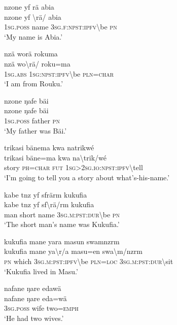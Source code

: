 \ea\label{ex:9:a2214}
nzone yf rä abia\\
\gll nzone	yf	{\textbackslash}rä/	abia\\
     1\textsc{sg}.\textsc{poss}	name	3\textsc{sg}.\textsc{f}:\textsc{npst}:\textsc{ipfv}{\textbackslash}be	\textsc{pn}\\
\glt `My name is Abia.'
\z

\ea\label{ex:9:a2216}
nzä worä rokuma\\
\gll nzä	wo{\textbackslash}rä/	roku=ma\\
     1\textsc{sg}.\textsc{abs}	1\textsc{sg}:\textsc{npst}:\textsc{ipfv}{\textbackslash}be	\textsc{pln}=\textsc{char}\\
\glt `I am from Rouku.'
\z

\ea\label{ex:9:a2218}
nzone ŋafe bäi\\
\gll nzone	ŋafe	bäi\\
     1\textsc{sg}.\textsc{poss}	father	\textsc{pn}\\
\glt `My father was Bäi.'
\z

\ea\label{ex:9:a2219}
trikasi bänema kwa natrikwé\\
\gll trikasi	bäne=ma	kwa	na{\textbackslash}trik/wé\\
     story	\textsc{ph}=\textsc{char}	\textsc{fut}	1\textsc{sg}>2\textsc{sg}.\textsc{io}:\textsc{npst}:\textsc{ipfv}{\textbackslash}tell\\
\glt `I'm going to tell you a story about what's-his-name.'
\z

\ea\label{ex:9:a2220}
kabe tnz yf sfrärm kukufia\\
\gll kabe	tnz	yf	sf{\textbackslash}rä/rm	kukufia\\
     man	short	name	3\textsc{sg}.\textsc{m}:\textsc{pst}:\textsc{dur}{\textbackslash}be	\textsc{pn}\\
\glt `The short man's name was Kukufia.'
\z

\ea\label{ex:9:a2221}
kukufia mane yara masun swamnzrm\\
\gll kukufia	mane	ya{\textbackslash}r/a	masu=en	swa{\textbackslash}m/nzrm\\
     \textsc{pn}	which	3\textsc{sg}.\textsc{m}:\textsc{pst}:\textsc{ipfv}{\textbackslash}be	\textsc{pln}=\textsc{loc}	3\textsc{sg}.\textsc{m}:\textsc{pst}:\textsc{dur}{\textbackslash}sit\\
\glt `Kukufia lived in Masu.'
\z

\ea\label{ex:9:a2223}
nafane ŋare edawä\\
\gll nafane	ŋare	eda=wä\\
     3\textsc{sg}.\textsc{poss}	wife	two=\textsc{emph}\\
\glt `He had two wives.'
\z

